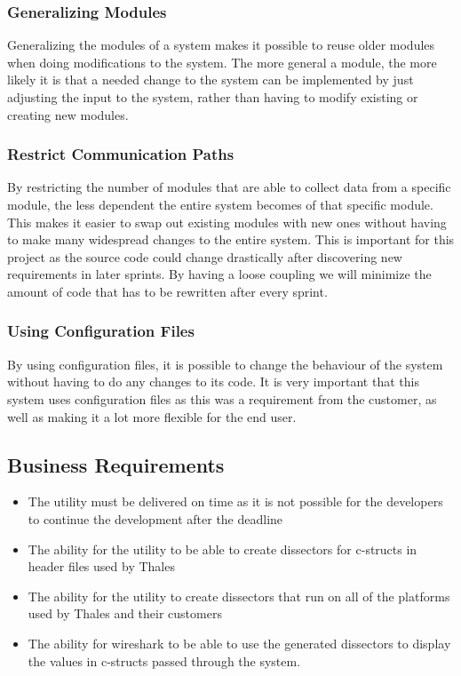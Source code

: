 \subsubsection{Generalizing Modules}
Generalizing the modules of a system makes it possible to reuse older modules when doing modifications to the system. The more general a module, the more likely it is that a needed change to the system can be implemented by just adjusting the input to the system, rather than having to modify existing or creating new modules.

\subsubsection{Restrict Communication Paths}
By restricting the number of modules that are able to collect data from a specific module, the less dependent the entire system becomes of that specific module. This makes it easier to swap out existing modules with new ones without having to make many widespread changes to the entire system. This is important for this project as the source code could change drastically after discovering new requirements in later sprints. By having a loose coupling we will minimize the amount of code that has to be rewritten after every sprint.

\subsubsection{Using Configuration Files}
By using configuration files, it is possible to change the behaviour of the system without having to do any changes to its code. It is very important that this system uses configuration files as this was a requirement from the customer, as well as making it a lot more flexible for the end user.

\subsection{Business Requirements}
\begin{itemize}
\item The \gls{utility} must be delivered on time as it is not possible for the developers to continue the development after the deadline
\item The ability for the \gls{utility} to be able to create \glspl{dissector} for \Gls{c}-\glspl{struct} in \gls{header} files used by Thales
\item The ability for the \gls{utility} to create \glspl{dissector} that run on all of the platforms used by Thales and their customers
\item The ability for \Gls{wireshark} to be able to use the generated \glspl{dissector} to display the values in \Gls{c}-\glspl{struct} passed through the system.
\end{itemize}



